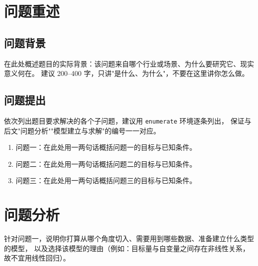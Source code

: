 \documentclass[12pt,a4paper]{ctexart}
\begin{document}
\newpage


\section{问题重述}
\label{sec:restate}

\subsection{问题背景}

在此处概述题目的实际背景：该问题来自哪个行业或场景、为什么要研究它、现实意义何在。
建议 200--400 字，只讲"是什么、为什么"，不要在这里讲你怎么做。

\subsection{问题提出}

依次列出题目要求解决的各个子问题，建议用 \texttt{enumerate} 环境逐条列出，
保证与后文"问题分析""模型建立与求解"的编号一一对应。

\begin{enumerate}
  \item 问题一：在此处用一两句话概括问题一的目标与已知条件。
  \item 问题二：在此处用一两句话概括问题二的目标与已知条件。
  \item 问题三：在此处用一两句话概括问题三的目标与已知条件。
\end{enumerate}

\section{问题分析}
\label{sec:analysis}

针对问题一，说明你打算从哪个角度切入、需要用到哪些数据、准备建立什么类型的模型，
以及选择该模型的理由（例如：目标量与自变量之间存在非线性关系，故不宜用线性回归）。
\end{document}
